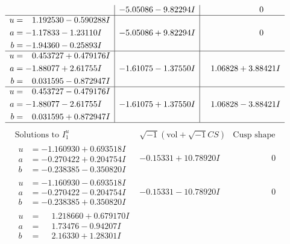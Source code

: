 \documentclass[1p]{elsarticle_modified}
\theoremstyle{definition}
\newcommand{\I}{\sqrt{-1}}
\begin{document}
$$\begin{array}{c|c|c}
 & -5.05086 - 9.82294 I & \phantom{-0.000000 } 0 \\ \hline\begin{aligned}
u &= \phantom{-}1.192530 - 0.590288 I \\
a &= -1.17833 - 1.23110 I \\
b &= -1.94360 - 0.25893 I\end{aligned}
 & -5.05086 + 9.82294 I & \phantom{-0.000000 } 0 \\ \hline\begin{aligned}
u &= \phantom{-}0.453727 + 0.479176 I \\
a &= -1.88077 + 2.61755 I \\
b &= \phantom{-}0.031595 - 0.872947 I\end{aligned}
 & -1.61075 - 1.37550 I & \phantom{-}1.06828 + 3.88421 I \\ \hline\begin{aligned}
u &= \phantom{-}0.453727 - 0.479176 I \\
a &= -1.88077 - 2.61755 I \\
b &= \phantom{-}0.031595 + 0.872947 I\end{aligned}
 & -1.61075 + 1.37550 I & \phantom{-}1.06828 - 3.88421 I\\
 \hline 
 \end{array}$$\newpage$$\begin{array}{c|c|c}  
\text{Solutions to }I^u_{1}& \I (\text{vol} + \sqrt{-1}CS) & \text{Cusp shape}\\
 \hline 
\begin{aligned}
u &= -1.160930 + 0.693518 I \\
a &= -0.270422 + 0.204754 I \\
b &= -0.238385 - 0.350820 I\end{aligned}
 & -0.15331 + 10.78920 I & \phantom{-0.000000 } 0 \\ \hline\begin{aligned}
u &= -1.160930 - 0.693518 I \\
a &= -0.270422 - 0.204754 I \\
b &= -0.238385 + 0.350820 I\end{aligned}
 & -0.15331 - 10.78920 I & \phantom{-0.000000 } 0 \\ \hline\begin{aligned}
u &= \phantom{-}1.218660 + 0.679170 I \\
a &= \phantom{-}1.73476 - 0.94207 I \\
b &= \phantom{-}2.16330 + 1.28301 I\end{aligned}

\end{array}$$
\end{document}
